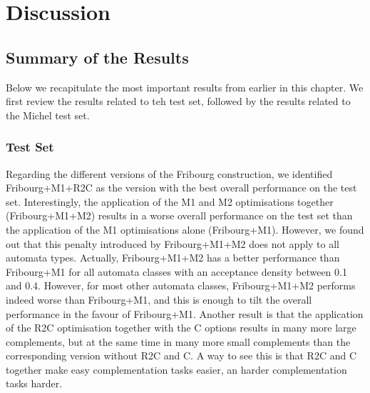 
\section{Discussion}
\label{5_discussion}











\subsection{Summary of the Results}
\label{5_summary}
Below we recapitulate the most important results from earlier in this chapter. We first review the results related to teh \goal{} test set, followed by the results related to the Michel test set.

\subsubsection{\goal{} Test Set}
Regarding the different versions of the Fribourg construction, we identified Fribourg+M1+R2C as the version with the best overall performance on the \goal{} test set. Interestingly, the application of the M1 and M2 optimisations together (Fribourg+M1+M2) results in a worse overall performance on the \goal{} test set than the application of the M1 optimisations alone (Fribourg+M1). However, we found out that this penalty introduced by Fribourg+M1+M2 does not apply to all automata types. Actually, Fribourg+M1+M2 has a better performance than Fribourg+M1 for all automata classes with an acceptance density between 0.1 and 0.4. However, for most other automata classes, Fribourg+M1+M2 performs indeed worse than Fribourg+M1, and this is enough to tilt the overall performance in the favour of Fribourg+M1. Another result is that the application of the R2C optimisation together with the C options results in many more large complements, but at the same time in many more small complements than the corresponding version without R2C and C. A way to see this is that R2C and C together make easy complementation tasks easier, an harder complementation tasks harder.

